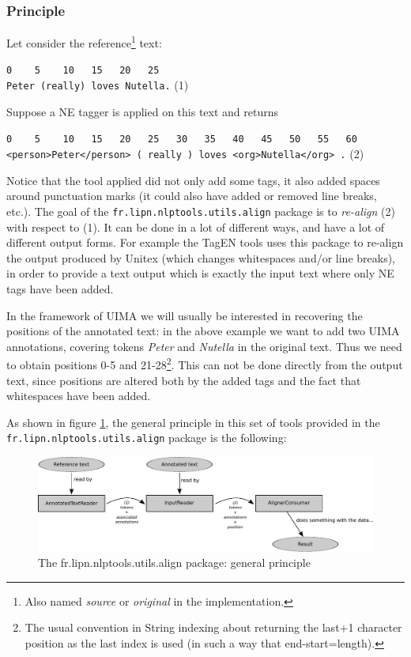 \documentclass{article}
\newcommand{\packname}{fr.lipn.nlptools}
\newcommand{\utilsPackname}{\packname.utils}
\begin{document}
\subsubsection{Principle}


Let consider the reference\footnote{Also named {\em source} or {\em original} in the implementation.} text: 

\verb+0    5    10   15   20   25   +\\
\verb+Peter (really) loves Nutella.+ (1)

 Suppose a NE tagger is applied on this text and returns 

\verb+0    5    10   15   20   25   30   35   40   45   50   55   60+\\
\verb+<person>Peter</person> ( really ) loves <org>Nutella</org> .+ (2)

Notice that the tool applied did not only add some tags, it also added spaces around punctuation marks (it could also have added or removed line breaks, etc.). The goal of the {\tt \utilsPackname .align} package is to {\em re-align} (2) with respect to (1). It can be done in a lot of different ways, and have a lot of different output forms. For example the TagEN tools uses this package to re-align the output produced by Unitex (which changes whitespaces and/or line breaks), in order to provide a text output which is exactly the input text where only NE tags have been added.

In the framework of UIMA we will usually be interested in recovering the positions of the annotated text: in the above example we want to add two UIMA annotations, covering tokens {\em Peter} and {\em Nutella} in the original text. Thus we need to obtain positions 0-5 and 21-28\footnote{The usual convention in String indexing about returning the last+1 character position as the last index is used (in such a way that end-start=length).}. This can not be done directly from the output text, since positions are altered both by the added tags and the fact that whitespaces have been added.

As shown in figure \ref{fig_principle_align}, the general principle in this set of tools provided in the {\tt \utilsPackname .align} package is the following:

\begin{figure}[htbp]
\includegraphics[width=\linewidth]{fig_principle_align.pdf}
\caption{\label{fig_principle_align} The \utilsPackname .align package: general principle}
\end{figure}
\end{document}
